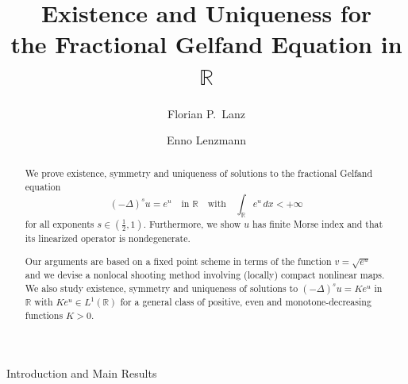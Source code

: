 \documentclass[reqno,10pt,a4paper]{amsart}
\makeatletter
\theoremstyle{definition}
\theoremstyle{definition}
\theoremstyle{remark}
\theoremstyle{remark}
\numberwithin{equation}{section}
\newcommand{\R}{\mathbb{R}}
\newcommand{\eu}{e}
\newcommand{\Ds}{(-\Delta)^{s}}
\def\section{\@startsection{section}{1}%
  \z@{1.5\linespacing\@plus\linespacing}{.5\linespacing}%
  {\normalfont\bfseries\large\centering}}
\makeatother
\begin{document}
\title[Fractional Gelfand Equation in $\R$]{Existence and Uniqueness for \\ the Fractional Gelfand Equation in $\R$}

\author{Florian P.~Lanz}
\address{F. P. Lanz, Universit\"at Basel, Departement Mathematik und Informatik, Spiegelgasse 1, CH-4051 Basel, Switzerland}%

\author{Enno Lenzmann}
\address{E. Lenzmann, University of Basel, Department of Mathematics and Computer Science, Spiegelgasse 1, CH-4051 Basel, Switzerland.}%



\begin{abstract}
We prove existence, symmetry and uniqueness of solutions to the fractional Gelfand equation
 $$
 \Ds u =  \eu^{u} \quad \mbox{in $\R$} \quad \mbox{with} \quad \int_\R  e^u \, dx < +\infty
 $$
for all exponents $s \in (\frac{1}{2},1)$. Furthermore, we show $u$ has finite Morse index and that its linearized operator is nondegenerate. 

 Our arguments are based on a fixed point scheme in terms of the function $v= \sqrt{e^u}$ and we devise a nonlocal shooting method involving (locally) compact nonlinear maps. We also study existence, symmetry and uniqueness of solutions to $\Ds u = K e^u$ in $\R$ with $K e^u \in L^1(\R)$ for a general class of positive, even and monotone-decreasing functions $K > 0$.
\end{abstract}

\maketitle

\setcounter{tocdepth}{1} 
\tableofcontents


\section{Introduction and Main Results} \label{sec:intro}
\end{document}
